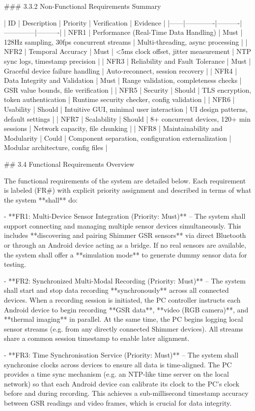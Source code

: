 \documentclass[12pt,a4paper]{article}
\begin{document}
### 3.3.2 Non-Functional Requirements Summary

| ID   | Description | Priority | Verification | Evidence |
|------|-------------|----------|--------------|----------|
| NFR1 | Performance (Real-Time Data Handling) | Must | 128Hz sampling, 30fps concurrent streams | Multi-threading, async processing |
| NFR2 | Temporal Accuracy | Must | <5ms clock offset, jitter measurement | NTP sync logs, timestamp precision |
| NFR3 | Reliability and Fault Tolerance | Must | Graceful device failure handling | Auto-reconnect, session recovery |
| NFR4 | Data Integrity and Validation | Must | Range validation, completeness checks | GSR value bounds, file verification |
| NFR5 | Security | Should | TLS encryption, token authentication | Runtime security checker, config validation |
| NFR6 | Usability | Should | Intuitive GUI, minimal user interaction | UI design patterns, default settings |
| NFR7 | Scalability | Should | 8+ concurrent devices, 120+ min sessions | Network capacity, file chunking |
| NFR8 | Maintainability and Modularity | Could | Component separation, configuration externalization | Modular architecture, config files |

## 3.4 Functional Requirements Overview

The functional requirements of the system are detailed below. Each requirement is labeled (FR#) with explicit priority assignment and described in terms of what the system **shall** do:

- **FR1: Multi-Device Sensor Integration (Priority: Must)** -- The system shall support connecting and managing multiple sensor devices simultaneously. This includes **discovering and pairing Shimmer GSR sensors** via direct Bluetooth or through an Android device acting as a bridge. If no real sensors are available, the system shall offer a **simulation mode** to generate dummy sensor data for testing.

- **FR2: Synchronized Multi-Modal Recording (Priority: Must)** -- The system shall start and stop data recording **synchronously** across all connected devices. When a recording session is initiated, the PC controller instructs each Android device to begin recording **GSR data**, **video (RGB camera)**, and **thermal imaging** in parallel. At the same time, the PC begins logging local sensor streams (e.g. from any directly connected Shimmer devices). All streams share a common session timestamp to enable later alignment.

- **FR3: Time Synchronisation Service (Priority: Must)** -- The system shall synchronise clocks across devices to ensure all data is time-aligned. The PC provides a time sync mechanism (e.g. an NTP-like time server on the local network) so that each Android device can calibrate its clock to the PC's clock before and during recording. This achieves a sub-millisecond timestamp accuracy between GSR readings and video frames, which is crucial for data integrity.
\end{document}

